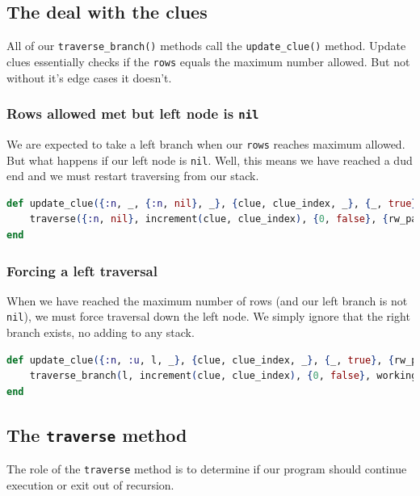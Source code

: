 \subsection{The deal with the clues}
All of our \texttt{traverse\_branch()} methods call the \texttt{update\_clue()} method. Update clues essentially checks if the \texttt{rows} equals the maximum number allowed. But not without it's edge cases it doesn't.

\subsubsection{Rows allowed met but left node is \texttt{nil}}
We are expected to take a left branch when our \texttt{rows} reaches maximum allowed. But what happens if our left node is \texttt{nil}. Well, this means we have reached a dud end and we must restart traversing from our stack.

\begin{lstlisting}[language=Elixir, caption={\texttt{update\_clue() when left node is \texttt{nil}, maximum rows have been reached}}]
def update_clue({:n, _, {:n, nil}, _}, {clue, clue_index, _}, {_, true}, {rw_pat, res, _}, stack) do
    traverse({:n, nil}, increment(clue, clue_index), {0, false}, {rw_pat, res, true}, stack)
end
\end{lstlisting}


\subsubsection{Forcing a left traversal}
When we have reached the maximum number of rows (and our left branch is not \texttt{nil}), we must force traversal down the left node. We simply ignore that the right branch exists, no adding to any stack.

\begin{lstlisting}[language=Elixir, caption={\texttt{update\_clue()} Forced left-branch traversal}]
def update_clue({:n, :u, l, _}, {clue, clue_index, _}, {_, true}, {rw_pat, res, _}, stack) do
    traverse_branch(l, increment(clue, clue_index), {0, false}, working_result(rw_pat, res), stack)
end
\end{lstlisting}

\subsection{The \texttt{traverse} method}
The role of the \texttt{traverse} method is to determine if our program should continue execution or exit out of recursion. 

